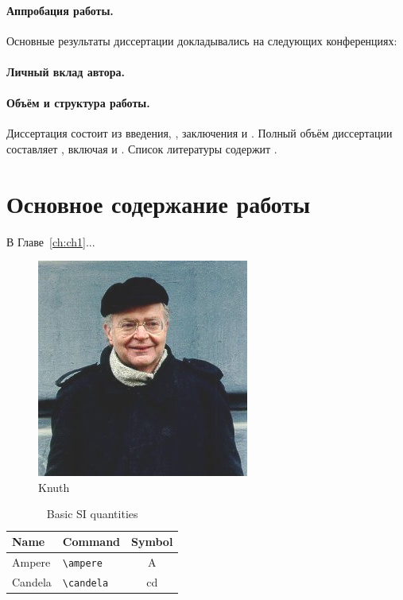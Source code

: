 \paragraph*{Аппробация работы.}
Основные результаты диссертации докладывались на следующих конференциях:
\printConferenceRU

\paragraph*{Личный вклад автора.}


\paragraph*{Объём и структура работы.}
Диссертация состоит из введения,
,
заключения и
.
%
Полный объём диссертации составляет
, включая
 и
.
Список литературы содержит
.


\newpage
\section*{Основное содержание работы}

В Главе~\ref{ch:ch1}...

\begin{figure}
	\centering
	\includegraphics[width=0.4\linewidth]{images/knuth}
	\caption{Knuth}
\end{figure}

\begin{table}
	\centering
	\caption{Basic SI quantities}%
	\begin{tabular}{llc}
		\toprule
		Name 	& 	Command 	& 	Symbol         \\
		\midrule
		Ampere     & \verb|\ampere| & \si{\ampere}   \\
		Candela   & \verb|\candela| & \si{\candela}  \\
		\bottomrule
	\end{tabular}
\end{table}

